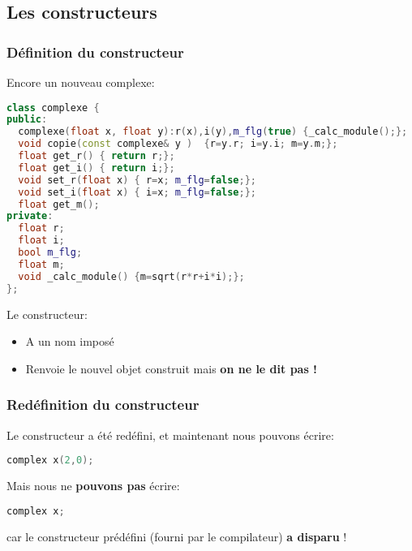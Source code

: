 \documentclass{beamer}
\begin{document}
\subsection{Les constructeurs}
\begin{frame}[fragile=singleslide,shrink=20]
\frametitle {Définition du constructeur}
Encore un nouveau complexe:
\begin{lstlisting}[language=c++]
class complexe {
public:
  complexe(float x, float y):r(x),i(y),m_flg(true) {_calc_module();}; 
  void copie(const complexe& y )  {r=y.r; i=y.i; m=y.m;};
  float get_r() { return r;};
  float get_i() { return i;};
  void set_r(float x) { r=x; m_flg=false;};
  void set_i(float x) { i=x; m_flg=false;};
  float get_m();
private:
  float r;
  float i;
  bool m_flg;
  float m;
  void _calc_module() {m=sqrt(r*r+i*i);};
};
\end{lstlisting}

Le constructeur:
\begin{itemize}
\item{A un nom imposé}
\item{Renvoie le nouvel objet construit mais \textbf{on ne le dit pas !}}
\end{itemize}
\end{frame}

\begin{frame}[fragile=singleslide,shrink=20]
\frametitle {Redéfinition du constructeur}
Le constructeur a été redéfini, et maintenant nous pouvons écrire:

\begin{lstlisting}[language=c++]
complex x(2,0);
\end{lstlisting}

Mais nous ne \textbf{pouvons pas} écrire:
\begin{lstlisting}[language=c++]
complex x;
\end{lstlisting}
car le constructeur prédéfini (fourni par le compilateur) \textbf{a disparu} !
\end{frame}
\end{document}
